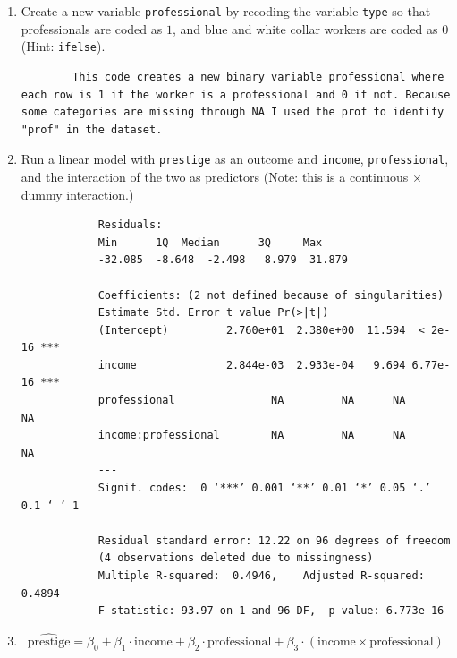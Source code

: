 \documentclass[12pt,letterpaper]{article}
\begin{document}
\newpage
\begin{enumerate}
	
	\item [(a)]
	Create a new variable \texttt{professional} by recoding the variable \texttt{type} so that professionals are coded as $1$, and blue and white collar workers are coded as $0$ (Hint: \texttt{ifelse}).
		
		\begin{center}
		\begin{lstlisting}
		This code creates a new binary variable professional where each row is 1 if the worker is a professional and 0 if not. Because some categories are missing through NA I used the prof to identify "prof" in the dataset. 
		\end{lstlisting}
		\end{center}
	\vspace{6cm}
	
	
	\item [(b)]
	Run a linear model with \texttt{prestige} as an outcome and \texttt{income}, \texttt{professional}, and the interaction of the two as predictors (Note: this is a continuous $\times$ dummy interaction.)
		
		\begin{center}
		\begin{verbatim}
			Residuals:
			Min      1Q  Median      3Q     Max 
			-32.085  -8.648  -2.498   8.979  31.879 
			
			Coefficients: (2 not defined because of singularities)
			Estimate Std. Error t value Pr(>|t|)    
			(Intercept)         2.760e+01  2.380e+00  11.594  < 2e-16 ***
			income              2.844e-03  2.933e-04   9.694 6.77e-16 ***
			professional               NA         NA      NA       NA    
			income:professional        NA         NA      NA       NA    
			---
			Signif. codes:  0 ‘***’ 0.001 ‘**’ 0.01 ‘*’ 0.05 ‘.’ 0.1 ‘ ’ 1
			
			Residual standard error: 12.22 on 96 degrees of freedom
			(4 observations deleted due to missingness)
			Multiple R-squared:  0.4946,	Adjusted R-squared:  0.4894 
			F-statistic: 93.97 on 1 and 96 DF,  p-value: 6.773e-16
		\end{verbatim}
		\end{center}
	
	\vspace{6cm}
	\item [(c)]
\[
\hat{\text{prestige}} = \beta_0 + \beta_1 \cdot \text{income} + \beta_2 \cdot \text{professional} + \beta_3 \cdot (\text{income} \times \text{professional})
\]



\end{enumerate}
\end{document}
